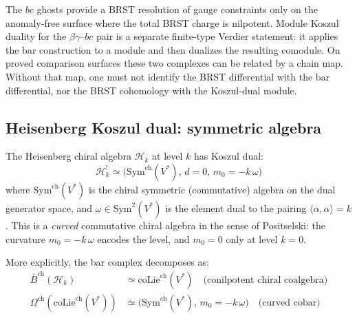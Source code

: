 \begin{remark}
\label{rem:brst-module-kd}
The $bc$ ghosts provide a BRST resolution of gauge constraints only
on the anomaly-free surface where the total BRST charge is nilpotent.
Module Koszul duality for the $\beta\gamma$--$bc$ pair is a separate
finite-type Verdier statement: it applies the bar construction to a
module and then dualizes the resulting comodule. On proved comparison
surfaces these two complexes can be related by a chain map. Without
that map, one must not identify the BRST differential with the bar
differential, nor the BRST cohomology with the Koszul-dual module.
\end{remark}


\subsection{Heisenberg Koszul dual: symmetric algebra}

\begin{theorem}\label{thm:heisenberg-koszul-dual-early}
The Heisenberg chiral algebra $\mathcal{H}_k$ at level $k$ has Koszul dual:
\[\mathcal{H}_k^! \simeq \bigl(\mathrm{Sym}^{\mathrm{ch}}(V^*),\, d = 0,\, m_0 = -k\,\omega\bigr)\]
where $\mathrm{Sym}^{\mathrm{ch}}(V^*)$ is the chiral symmetric (commutative) algebra on the dual generator space, and $\omega \in \mathrm{Sym}^2(V^*)$ is the element dual to the pairing $\langle \alpha, \alpha \rangle = k$. This is a \emph{curved} commutative chiral algebra in the sense of Positselski: the curvature $m_0 = -k\,\omega$ encodes the level, and $m_0 = 0$ only at level $k = 0$.

More explicitly, the bar complex decomposes as:
\begin{align}
\bar{B}^{\mathrm{ch}}(\mathcal{H}_k) &\simeq \mathrm{coLie}^{\mathrm{ch}}(V^*) \quad \text{(conilpotent chiral coalgebra)} \\
\Omega^{\mathrm{ch}}(\mathrm{coLie}^{\mathrm{ch}}(V^*)) &\simeq \bigl(\mathrm{Sym}^{\mathrm{ch}}(V^*),\, m_0 = -k\,\omega\bigr) \quad \text{(curved cobar)}
\end{align}
\end{theorem}

